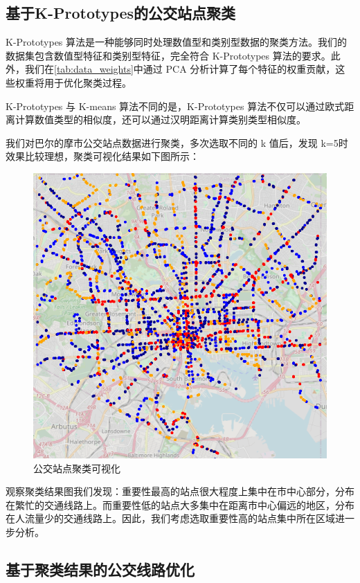 \documentclass[12pt, a4paper, oneside]{ctexart}
\begin{document}
\subsection{基于K-Prototypes的公交站点聚类}

K-Prototypes 算法是一种能够同时处理数值型和类别型数据的聚类方法。我们的数据集包含数值型特征和类别型特征，完全符合 K-Prototypes 算法的要求。此外，我们在\ref{tab:data_weights}中通过 PCA 分析计算了每个特征的权重贡献，这些权重将用于优化聚类过程。

K-Prototypes 与 K-means 算法不同的是，K-Prototypes 算法不仅可以通过欧式距离计算数值类型的相似度，还可以通过汉明距离计算类别类型相似度。

我们对巴尔的摩市公交站点数据进行聚类，多次选取不同的 k 值后，发现 k=5时效果比较理想，聚类可视化结果如下图所示：

\begin{figure}[H]
  \centering
  \includegraphics[width=\textwidth]{figures/cluster.png}
  \caption{公交站点聚类可视化}
  \label{fig:cluster}
\end{figure}

观察聚类结果图我们发现：重要性最高的站点很大程度上集中在市中心部分，分布在繁忙的交通线路上。而重要性低的站点大多集中在距离市中心偏远的地区，分布在人流量少的交通线路上。因此，我们考虑选取重要性高的站点集中所在区域进一步分析。

\subsection{基于聚类结果的公交线路优化}
\end{document}
